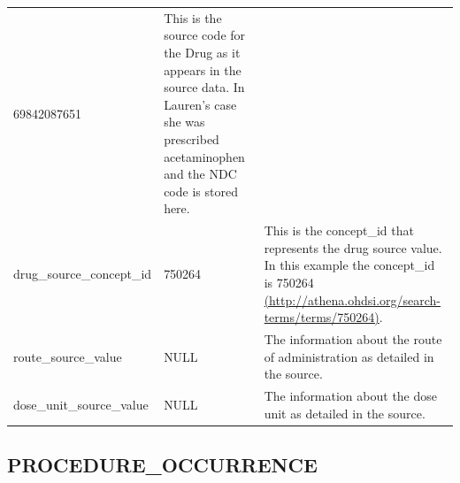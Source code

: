 \documentclass[]{book}
\begin{document}
\begin{longtable}[]{@{}lll@{}}
\begin{minipage}[t]{0.14\columnwidth}
69842087651\strut
\end{minipage} & \begin{minipage}[t]{0.48\columnwidth}\raggedright
This is the source code for the Drug as it appears in the source data. In Lauren's case she was prescribed acetaminophen and the NDC code is stored here.\strut
\end{minipage}\tabularnewline
\begin{minipage}[t]{0.30\columnwidth}\raggedright
drug\_source\_concept\_id\strut
\end{minipage} & \begin{minipage}[t]{0.14\columnwidth}\raggedright
750264\strut
\end{minipage} & \begin{minipage}[t]{0.48\columnwidth}\raggedright
This is the concept\_id that represents the drug source value. In this example the concept\_id is 750264 \href{http://athena.ohdsi.org/search-terms/terms/750264}{(http://athena.ohdsi.org/search-terms/terms/750264)}.\strut
\end{minipage}\tabularnewline
\begin{minipage}[t]{0.30\columnwidth}\raggedright
route\_source\_value\strut
\end{minipage} & \begin{minipage}[t]{0.14\columnwidth}\raggedright
NULL\strut
\end{minipage} & \begin{minipage}[t]{0.48\columnwidth}\raggedright
The information about the route of administration as detailed in the source.\strut
\end{minipage}\tabularnewline
\begin{minipage}[t]{0.30\columnwidth}\raggedright
dose\_unit\_source\_value\strut
\end{minipage} & \begin{minipage}[t]{0.14\columnwidth}\raggedright
NULL\strut
\end{minipage} & \begin{minipage}[t]{0.48\columnwidth}\raggedright
The information about the dose unit as detailed in the source.\strut
\end{minipage}\tabularnewline
\bottomrule
\end{longtable}

\hypertarget{procedureOccurrence}{%
\subsection{PROCEDURE\_OCCURRENCE}\label{procedureOccurrence}}
\end{document}
